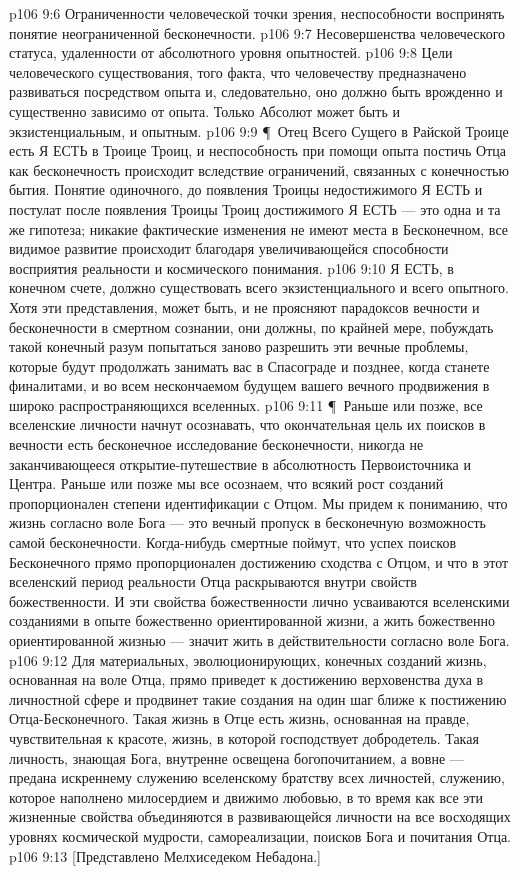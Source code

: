 \vs p106 9:6 \bibnobreakspace Ограниченности человеческой точки зрения, неспособности воспринять понятие неограниченной бесконечности.
\vs p106 9:7 \bibnobreakspace Несовершенства человеческого статуса, удаленности от абсолютного уровня опытностей.
\vs p106 9:8 \bibnobreakspace Цели человеческого существования, того факта, что человечеству предназначено развиваться посредством опыта и, следовательно, оно должно быть врожденно и существенно зависимо от опыта. Только Абсолют может быть и экзистенциальным, и опытным.
\vs p106 9:9 \P\ Отец Всего Сущего в Райской Троице есть Я ЕСТЬ в Троице Троиц, и неспособность при помощи опыта постичь Отца как бесконечность происходит вследствие ограничений, связанных с конечностью бытия. Понятие  одиночного, до появления Троицы недостижимого Я ЕСТЬ и постулат  после появления Троицы Троиц достижимого Я ЕСТЬ --- это одна и та же гипотеза; никакие фактические изменения не имеют места в Бесконечном, все видимое развитие происходит благодаря увеличивающейся способности восприятия реальности и космического понимания.
\vs p106 9:10 Я ЕСТЬ, в конечном счете, должно существовать  всего экзистенциального и  всего опытного. Хотя эти представления, может быть, и не проясняют парадоксов вечности и бесконечности в смертном сознании, они должны, по крайней мере, побуждать такой конечный разум попытаться заново разрешить эти вечные проблемы, которые будут продолжать занимать вас в Спасограде и позднее, когда станете финалитами, и во всем нескончаемом будущем вашего вечного продвижения в широко распространяющихся вселенных.
\vs p106 9:11 \P\ Раньше или позже, все вселенские личности начнут осознавать, что окончательная цель их поисков в вечности есть бесконечное исследование бесконечности, никогда не заканчивающееся открытие\hyp{}путешествие в абсолютность Первоисточника и Центра. Раньше или позже мы все осознаем, что всякий рост созданий пропорционален степени идентификации с Отцом. Мы придем к пониманию, что жизнь согласно воле Бога --- это вечный пропуск в бесконечную возможность самой бесконечности. Когда\hyp{}нибудь смертные поймут, что успех поисков Бесконечного прямо пропорционален достижению сходства с Отцом, и что в этот вселенский период реальности Отца раскрываются внутри свойств божественности. И эти свойства божественности лично усваиваются вселенскими созданиями в опыте божественно ориентированной жизни, а жить божественно ориентированной жизнью --- значит жить в действительности согласно воле Бога.
\vs p106 9:12 Для материальных, эволюционирующих, конечных созданий жизнь, основанная на воле Отца, прямо приведет к достижению верховенства духа в личностной сфере и продвинет такие создания на один шаг ближе к постижению Отца\hyp{}Бесконечного. Такая жизнь в Отце есть жизнь, основанная на правде, чувствительная к красоте, жизнь, в которой господствует добродетель. Такая личность, знающая Бога, внутренне освещена богопочитанием, а вовне --- предана искреннему служению вселенскому братству всех личностей, служению, которое наполнено милосердием и движимо любовью, в то время как все эти жизненные свойства объединяются в развивающейся личности на все восходящих уровнях космической мудрости, самореализации, поисков Бога и почитания Отца.
\vs p106 9:13 [Представлено Мелхиседеком Небадона.]
